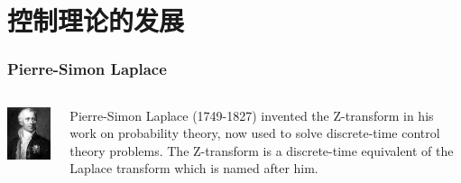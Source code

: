 \documentclass{beamer}
\begin{document}
\section{控制理论的发展}
\label{sec-2}
\begin{frame}
\frametitle{Pierre-Simon Laplace}
\label{sec-2-1}
\begin{columns}
\begin{column}{0.3\textwidth}
\label{sec-2-1-1}


\includegraphics[width=.9\linewidth]{image/Laplace.jpg}
\end{column}
\begin{column}{0.7\textwidth}
\label{sec-2-1-2}


   Pierre-Simon Laplace (1749-1827) invented the Z-transform in his work on probability theory, now used to solve discrete-time control theory problems. The Z-transform is a discrete-time equivalent of the Laplace transform which is named after him.
\end{column}
\end{columns}
\end{frame}
\end{document}
